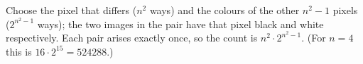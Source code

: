 Choose the pixel that differs ($n^2$ ways) and the colours of the other $n^2-1$ pixels ($2^{n^2-1}$ ways); the two images in the pair have that pixel black and white respectively. Each pair arises exactly once, so the count is $\boxed{n^2\cdot2^{n^2-1}}$. (For $n=4$ this is $16\cdot2^{15}=524288$.)

